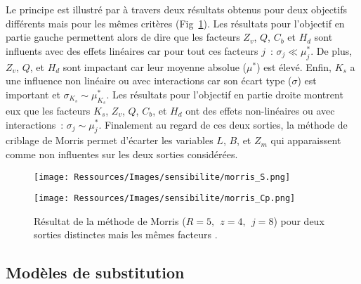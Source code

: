 Le principe est illustré par \textcite{Iooss2011} à travers deux résultats obtenus
pour deux objectifs différents mais pour les mêmes critères (Fig~\ref{fig:meth_graph_morris}).
Les résultats pour l’objectif en partie gauche permettent alors de dire que
les facteurs $Z_{v}$, $Q$, $C_{b}$ et $H_{d}$ sont influents
avec des effets linéaires car pour tout ces facteurs $j$~: $\sigma_{j} \ll \mu^{*}_{j}$.
De plus, $Z_{v}$, $Q$, et $H_{d}$ sont impactant car leur moyenne absolue ($\mu^{*}$) est élevé.
Enfin, $K_{s}$ a une influence non linéaire ou avec interactions car son écart type ($\sigma$)
est important et  $\sigma_{K_{s}} \sim \mu^{*}_{K_{s}}$.
Les résultats pour l’objectif en partie droite montrent eux que les facteurs $K_{s}$, $Z_{v}$, $Q$, $C_{b}$,
et $H_{d}$ ont des effets non-linéaires ou avec interactions~: $\sigma_{j} \sim
\mu^{*}_{j}$. Finalement au regard de ces deux sorties, la méthode de criblage de Morris
permet d’écarter les variables $L$, $B$, et $Z_{m}$ qui apparaissent comme non influentes
sur les deux sorties considérées.

\begin{figure}
  \begin{center}
    \begin{minipage}{.45\textwidth}
          \texttt{[image: Ressources/Images/sensibilite/morris\_S.png]}
    \end{minipage}
    \hfill
    \begin{minipage}{.45\textwidth}
          \texttt{[image: Ressources/Images/sensibilite/morris\_Cp.png]}
    \end{minipage}
  \end{center}
  \caption{Résultat de la méthode de Morris ($R = 5,~~ z = 4,~~ j=8$) pour deux
           sorties distinctes mais les mêmes facteurs \parencite{Iooss2011}.
             \label{fig:meth_graph_morris}}
\end{figure}



\subsection{Modèles de substitution} %
\label{sub:modeles_de_substitution}
